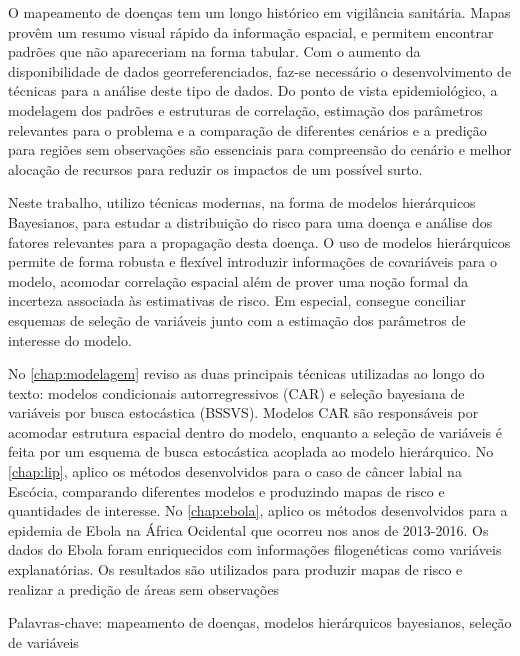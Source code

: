 \setlength{\absparsep}{18pt} 
\begin{resumo}[Resumo]

O mapeamento de doenças tem um longo histórico em vigilância sanitária. Mapas provêm um resumo visual rápido da informação espacial, e permitem encontrar padrões que não apareceriam na forma tabular. Com o aumento da disponibilidade de dados georreferenciados, faz-se necessário o desenvolvimento de técnicas para a análise deste tipo de dados. Do ponto de vista epidemiológico, a modelagem dos padrões e estruturas de correlação, estimação dos parâmetros relevantes para o problema e a comparação de diferentes cenários e a predição para regiões sem observações são essenciais para compreensão do cenário e melhor alocação de recursos para reduzir os impactos de um possível surto.

Neste trabalho, utilizo técnicas modernas, na forma de modelos hierárquicos Bayesianos, para estudar a distribuição do risco para uma doença e análise dos fatores relevantes para a propagação desta doença. O uso de modelos hierárquicos permite de forma robusta e flexível introduzir informações de covariáveis para o modelo, acomodar correlação espacial além de prover uma noção formal da incerteza associada às estimativas de risco. Em especial, consegue conciliar esquemas de seleção de variáveis junto com a estimação dos parâmetros de interesse do modelo.

No \autoref{chap:modelagem} reviso as duas principais técnicas utilizadas ao longo do texto: modelos condicionais autorregressivos (CAR) e seleção bayesiana de variáveis por busca estocástica (BSSVS). Modelos CAR são responsáveis por acomodar estrutura espacial dentro do modelo, enquanto a seleção de variáveis é feita por um esquema de busca estocástica acoplada ao modelo hierárquico. No \autoref{chap:lip}, aplico os métodos desenvolvidos para o caso de câncer labial na Escócia, comparando diferentes modelos e produzindo mapas de risco e quantidades de interesse. No \autoref{chap:ebola}, aplico os métodos desenvolvidos para a epidemia de Ebola na África Ocidental que ocorreu nos anos de 2013-2016. Os dados do Ebola foram enriquecidos com informações filogenéticas como variáveis explanatórias. Os resultados são utilizados para produzir mapas de risco e realizar a predição de áreas sem observações

 Palavras-chave: mapeamento de doenças, modelos hierárquicos bayesianos, seleção de variáveis 
\end{resumo}

